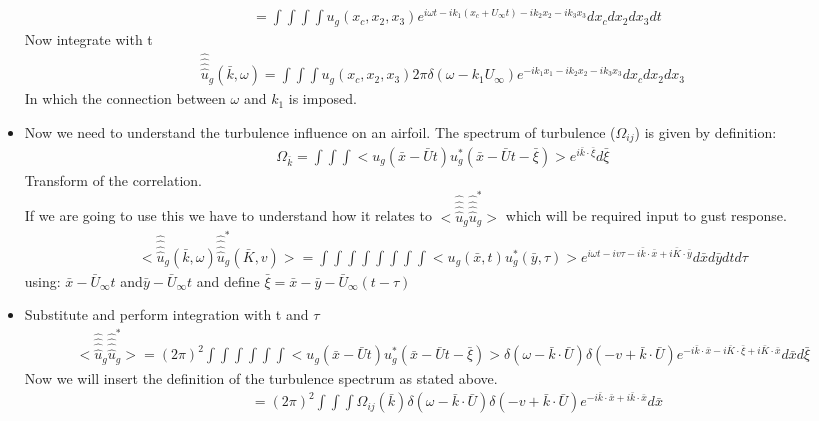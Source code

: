 \documentclass{article}
\begin{document}
\begin{itemize}
\begin{align*}
\qquad = \int \int \int \int u_g(x_c, x_2, x_3) e^{i\omega t - ik_1(x_c+U_\infty t) -ik_2x_2 - ik_3x_3} dx_c dx_2 dx_3 dt
\end{align*}
Now integrate with t
\begin{align*}
\hat{\hat{\hat{\hat u}}}_g(\bar{k},\omega) = \int \int \int u_g(x_c,x_2,x_3)2\pi\delta(\omega - k_1U_\infty)e^{-ik_1x_1 - ik_2x_2 -ik_3x_3}dx_cdx_2dx_3
\end{align*}
In which the connection between $\omega$ and $k_1$ is imposed. 
\newpage

\item Now we need to understand the turbulence influence on an airfoil. The spectrum of turbulence ($\Omega_{ij}$) is given by definition:
\begin{align*}
\Omega_{\bar{k}} = \int \int \int \Big<u_g(\bar{x}-\bar{U}t) u_g^*(\bar{x}-\bar{U}t-\bar{\xi})\Big> e^{i\bar{k}\cdot\bar{\xi}}d\bar{\xi}
\end{align*}
Transform of the correlation. \\
If we are going to use this we have to understand how it relates to $\big<\hat{\hat{\hat{\hat{u}}}}_g \hat{\hat{\hat{\hat{u}}}}_g^*\big>$ which will be required input to gust response. 
\begin{align*}
\Big<\hat{\hat{\hat{\hat{u}}}}_g(\bar{k}, \omega)\hat{\hat{\hat{\hat{u}}}}_g^*(\bar{K},v)\Big> = \int \int \int \int \int \int \int \int \Big<u_g(\bar{x},t) u_g^*(\bar{y},\tau)\Big> e^{i\omega t - iv\tau - i\bar{k}\cdot\bar{x} + i\bar{K}\cdot\bar{y}}d\bar{x}d\bar{y}dtd\tau
\end{align*}
using: $\bar{x} - \bar{U}_\infty t$ and$ \bar{y} -\bar{U}_\infty t $ and define $\bar{\xi} = \bar{x} - \bar{y} - \bar{U}_\infty(t - \tau)$
\item Substitute and perform integration with t and $\tau$
\begin{align*}
\Big<\hat{\hat{\hat{\hat u}}}_g \hat{\hat{\hat{\hat u}}}_g^*\Big> = (2\pi)^2 \int \int \int \int \int \int \Big<u_g(\bar{x} - \bar{U}t)u_g^*(\bar{x} - \bar{U}t - \bar{\xi})\Big> \delta(\omega - \bar{k}\cdot\bar{U})\delta(-v+\bar{k}\cdot\bar{U})e^{-i\bar{k}\cdot\bar{x}-i\bar{K}\cdot\bar{\xi}+i\bar{K}\cdot\bar{x}}d\bar{x}d\bar{\xi}
\end{align*}
Now we will insert the definition of the turbulence spectrum as stated above. 
\begin{align*}
\qquad = (2\pi)^2 \int \int \int \Omega_{ij}(\bar{k}) \delta(\omega - \bar{k}\cdot\bar{U})\delta(-v+\bar{k}\cdot\bar{U})e^{-i\bar{k}\cdot\bar{x} + i\bar{k}\cdot\bar{x}}d\bar{x}

\end{align*}
\end{itemize}
\end{document}
